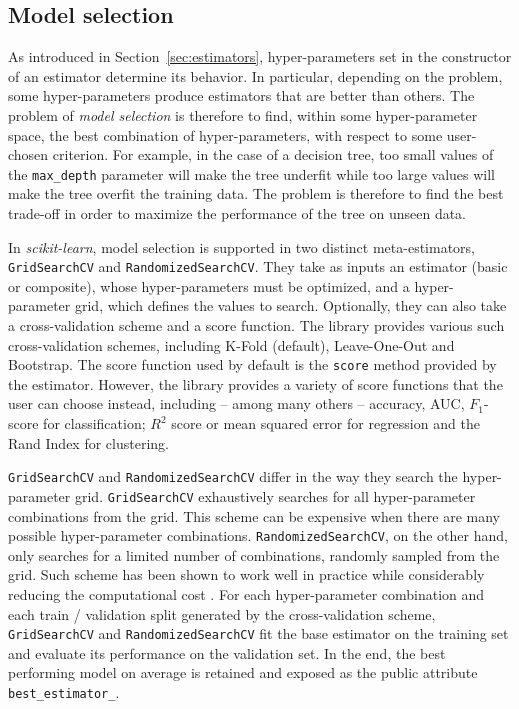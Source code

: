\documentclass{llncs}
\newcommand{\sklearn}{\textit{scikit-learn}\xspace}
\begin{document}
\subsection{Model selection}

As introduced in Section~\ref{sec:estimators}, hyper-parameters set in the
constructor of an estimator determine its behavior. In particular, depending on
the problem, some hyper-parameters produce estimators that are better than
others. The problem of \textit{model selection} is therefore to find, within
some hyper-parameter space, the best combination of hyper-parameters, with
respect to some user-chosen criterion. For example, in the case of a decision
tree, too small values of the \texttt{max\_depth} parameter will make the tree
underfit while too large values will make the tree overfit the training data.
The problem is therefore to find the best trade-off in order to maximize
the performance of the tree on unseen data.

In \sklearn, model selection is supported in two distinct meta-estimators,
\texttt{GridSearchCV} and \texttt{RandomizedSearchCV}.  They take as inputs an
estimator (basic or composite), whose hyper-parameters must be optimized, and a
hyper-parameter grid, which defines the values to search. Optionally, they can
also take a cross-validation scheme and a score function.  The library provides
various such cross-validation schemes, including K-Fold (default), Leave-One-Out
and Bootstrap. The score function used by default is the \texttt{score} method
provided by the estimator. However, the library provides a variety of
score functions that the user can choose instead, including -- among many others
-- accuracy, AUC, $F_1$-score for classification; $R^2$ score or mean squared
error for regression and the Rand Index for clustering.

\texttt{GridSearchCV} and \texttt{RandomizedSearchCV} differ in the way they
search the hyper-parameter grid.  \texttt{GridSearchCV} exhaustively searches
for all hyper-parameter combinations from the grid. This scheme can be expensive
when there are many possible hyper-parameter combinations.
\texttt{RandomizedSearchCV}, on the other hand, only searches for a limited
number of combinations, randomly sampled from the grid. Such scheme has been
shown to work well in practice while considerably reducing the computational
cost \citep{bergstra2012}. For each hyper-parameter combination and each train /
validation split generated by the cross-validation scheme, \texttt{GridSearchCV}
and \texttt{RandomizedSearchCV} fit the base estimator on the training set and
evaluate its performance on the validation set.  In the end, the best performing
model on average is retained and exposed as the public attribute
\texttt{best\_estimator\_}.
\end{document}
